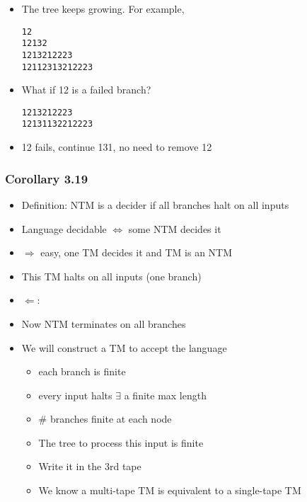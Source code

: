 \begin{frame}[allowframebreaks]
\begin{itemize}
\item The tree keeps growing. For example, 

  \begin{alltt}
    1 2
    12 13 2
    12 13 21 22 23
    121 123 13 21 22 23
  \end{alltt}
\item What if 12 is a failed branch?

  \begin{alltt}
    \alert{12} 13 21 22 23
    \alert{12} 131 132 21 22 23
  \end{alltt}

\item
  12 fails, continue 131, no need to remove 12

\end{itemize}\end{frame}



\begin{frame}[allowframebreaks] \frametitle{Corollary 3.19}
  \begin{itemize}
\item Definition: NTM is a decider if all branches halt on all inputs


\item Language decidable $\Leftrightarrow$
some NTM decides it

\item
  $\Rightarrow$ easy, one TM decides it and TM is an NTM

\item
  [] This TM halts on all inputs (one branch)

\item
  $\Leftarrow$:
\item
  [] Now NTM terminates on all branches 

\item
  [] We will construct a TM to accept the language
\begin{itemize}
\item each branch is finite

\item [] every input halts $\exists $ a finite max length
\item \# branches finite at each node

\item
  [] The tree to process this input is finite
\item Write it in the 3rd tape
\item We know a multi-tape TM is equivalent to a single-tape TM
\end{itemize}

\end{itemize}\end{frame}

